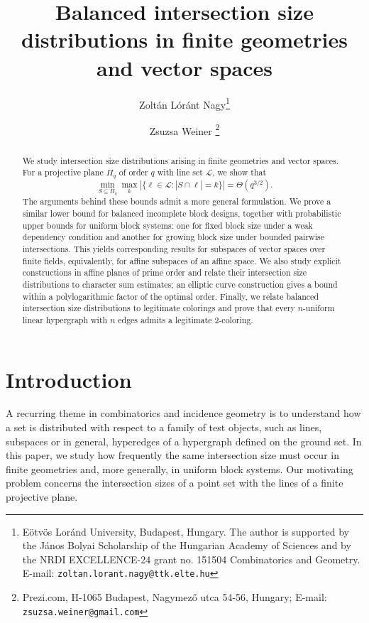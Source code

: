 \documentclass[10pt]{article}
\title{Balanced intersection size distributions in finite geometries and vector spaces}
\author{Zolt\'an L\'or\'ant Nagy\thanks{
		E\"otv\"os Lor\'and University, Budapest, Hungary. The author is supported by the J\'anos Bolyai Scholarship of the Hungarian Academy of Sciences and by the NRDI EXCELLENCE-24 grant no. 151504 Combinatorics and Geometry. %
		E-mail: {\tt zoltan.lorant.nagy@ttk.elte.hu}}
	\and Zsuzsa Weiner \thanks{Prezi.com, H-1065 Budapest, Nagymező utca 54-56, Hungary;  E-mail: {\tt zsuzsa.weiner@gmail.com}
}}
\date{}
\theoremstyle{definition}
\newcommand{\zsst}[1]{%
	\bgroup
	\markoverwith{\textcolor{magenta}{\rule[0.5ex]{2pt}{1.2pt}}}%
	\ULon{#1}%
	\egroup
}
\begin{document}
	
	\maketitle
	
	
	\begin{abstract}
		We study intersection size distributions arising in finite geometries and vector spaces.
		For a projective plane \(\Pi_q\) of order \(q\) with line set
		\(\mathcal L\), we show that
		\[
		\min_{S\subseteq\Pi_q}\max_k
		|\{\ell\in\mathcal L:|S\cap\ell|=k\}|=\Theta(q^{3/2}).
		\]
		The arguments behind these bounds admit a more general formulation.
		We prove a similar lower bound for balanced incomplete block designs, together
		with probabilistic upper bounds for uniform block systems: one for fixed
		block size under a weak dependency condition and another for growing
		block size under bounded pairwise intersections. This yields corresponding
		results for subspaces of vector spaces over finite fields, equivalently, for affine subspaces of an affine space. 
		We also study explicit constructions in affine
		planes of prime order and relate their intersection size distributions
		to character sum estimates; an elliptic curve construction gives a bound
		within a polylogarithmic factor of the optimal order. Finally, we relate
		balanced intersection size distributions to legitimate colorings and
		prove that every \(n\)-uniform linear hypergraph with \(n\) edges admits
		a legitimate \(2\)-coloring.
	\end{abstract}
	
	
	
	
	\section{Introduction}
	
	
	A recurring theme in combinatorics and incidence geometry is to understand how a set is distributed
	with respect to a family of test objects, such as lines, subspaces or in general, hyperedges of a hypergraph defined on the ground set. 
	{In this paper, we study how frequently the same intersection size must
		occur in finite geometries and, more generally, in uniform block systems.
		Our motivating problem concerns the intersection sizes of a point set with the lines of a finite projective plane.}
	
\end{document}
